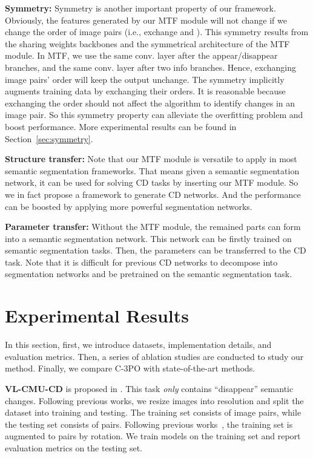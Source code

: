 \documentclass[review]{elsarticle}
\begin{document}
\textbf{Symmetry:} Symmetry is another important property of our framework. Obviously, the features generated by our MTF module will not change if we change the order of image pairs (i.e., exchange  and ). This symmetry results from the sharing weights backbones and the symmetrical architecture of the MTF module. In MTF, we use the same conv. layer after the appear/disappear branches, and the same conv. layer after two info branches. Hence, exchanging image pairs' order will keep the output unchange. The symmetry implicitly augments training data by exchanging their orders. It is reasonable because exchanging the order should not affect the algorithm to identify changes in an image pair. So this symmetry property can alleviate the overfitting problem and boost performance. More experimental results can be found in Section~\ref{sec:symmetry}. 

\textbf{Structure transfer:} Note that our MTF module is versatile to apply in most semantic segmentation frameworks. That means given a semantic segmentation network, it can be used for solving CD tasks by inserting our MTF module. So we in fact propose a framework to generate CD networks. And the performance can be boosted by applying more powerful segmentation networks.

\textbf{Parameter transfer:} Without the MTF module, the remained parts can form into a semantic segmentation network. This network can be firstly trained on semantic segmentation tasks. Then, the parameters can be transferred to the CD task. Note that it is difficult for previous CD networks to decompose into segmentation networks and be pretrained on the semantic segmentation task.

\section{Experimental Results}

In this section, first, we introduce datasets, implementation details, and evaluation metrics. Then, a series of ablation studies are conducted to study our method. Finally, we compare C-3PO with state-of-the-art methods.

\textbf{VL-CMU-CD} is proposed in \cite{VL_CMU_CD}. This task \emph{only} contains ``disappear'' semantic changes. Following previous works, we resize images into  resolution and split the dataset into training and testing. The training set consists of  image pairs, while the testing set consists of  pairs. Following previous works~\cite{CSCDNet,DR_TANet,FC_EF,ChangeNet}, the training set is augmented to  pairs by rotation. We train models on the training set and report evaluation metrics on the testing set.
\end{document}
